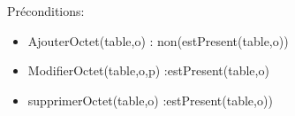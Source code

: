 \documentclass{article}
\begin{document}
  	 Préconditions: 
	\begin{itemize}[label=$\- $, leftmargin=2cm]
		  \item AjouterOctet(table,o) : non(estPresent(table,o))
		  \item ModifierOctet(table,o,p) :estPresent(table,o)
		  \item supprimerOctet(table,o) :estPresent(table,o))	                                   
	\end{itemize}
        
\end{document}
